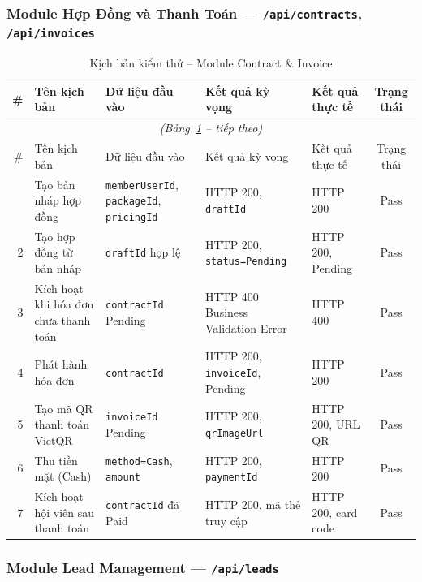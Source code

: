 \subsubsection{Module Hợp Đồng và Thanh Toán — \texttt{/api/contracts}, \texttt{/api/invoices}}

\begin{longtable}{r p{3.2cm} p{2.8cm} p{2.8cm} p{2cm} c}
\caption{Kịch bản kiểm thử – Module Contract \& Invoice}
\label{tab:tc-contract} \\
\toprule
\# & Tên kịch bản & Dữ liệu đầu vào & Kết quả kỳ vọng & Kết quả thực tế & Trạng thái \\
\midrule
\endfirsthead
\multicolumn{6}{c}{\textit{(Bảng~\ref{tab:tc-contract} – tiếp theo)}} \\ \toprule
\# & Tên kịch bản & Dữ liệu đầu vào & Kết quả kỳ vọng & Kết quả thực tế & Trạng thái \\ \midrule
\endhead \midrule \endfoot \bottomrule \endlastfoot
1 & Tạo bản nháp hợp đồng              & \texttt{memberUserId}, \texttt{packageId}, \texttt{pricingId} & HTTP 200, \texttt{draftId} & HTTP 200 & Pass \\
2 & Tạo hợp đồng từ bản nháp           & \texttt{draftId} hợp lệ    & HTTP 200, \texttt{status=Pending}  & HTTP 200, Pending & Pass \\
3 & Kích hoạt khi hóa đơn chưa thanh toán & \texttt{contractId} Pending & HTTP 400 Business Validation Error & HTTP 400 & Pass \\
4 & Phát hành hóa đơn                  & \texttt{contractId}        & HTTP 200, \texttt{invoiceId}, Pending & HTTP 200 & Pass \\
5 & Tạo mã QR thanh toán VietQR        & \texttt{invoiceId} Pending & HTTP 200, \texttt{qrImageUrl}      & HTTP 200, URL QR & Pass \\
6 & Thu tiền mặt (Cash)                & \texttt{method=Cash}, \texttt{amount} & HTTP 200, \texttt{paymentId} & HTTP 200 & Pass \\
7 & Kích hoạt hội viên sau thanh toán  & \texttt{contractId} đã Paid & HTTP 200, mã thẻ truy cập & HTTP 200, card code & Pass \\
\end{longtable}

\subsubsection{Module Lead Management — \texttt{/api/leads}}

